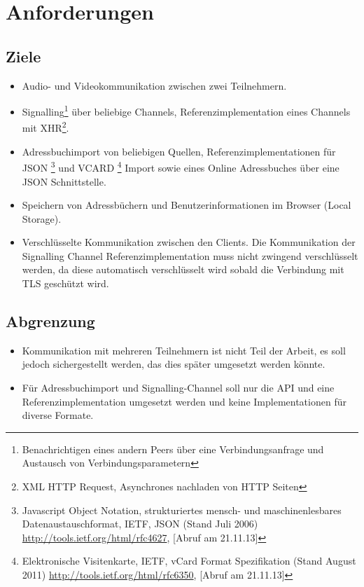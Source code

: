 \chapter{Anforderungen}
	\section{Ziele}
		\begin{itemize}
			\item Audio- und Videokommunikation zwischen zwei Teilnehmern.
			\item Signalling\footnote{Benachrichtigen eines andern Peers über eine Verbindungsanfrage und Austausch von Verbindungsparametern} über beliebige Channels, Referenzimplementation eines Channels mit XHR\footnote{XML HTTP Request, Asynchrones nachladen von HTTP Seiten}.
			\item Adressbuchimport von beliebigen Quellen, Referenzimplementationen für JSON
				\footnote{Javascript Object Notation, strukturiertes mensch- und maschinenlesbares Datenaustauschformat, 
					IETF, JSON (Stand Juli 2006)
					\hyperlink{http://tools.ietf.org/html/rfc4627}{http://tools.ietf.org/html/rfc4627}, [Abruf am 21.11.13]
				} und VCARD
				\footnote{Elektronische Visitenkarte, IETF, vCard Format Spezifikation (Stand August 2011) 
					\hyperlink{http://tools.ietf.org/html/rfc6350}{http://tools.ietf.org/html/rfc6350}, [Abruf am 21.11.13]
				} Import sowie eines Online Adressbuches über eine JSON Schnittstelle.
			\item Speichern von Adressbüchern und Benutzerinformationen im Browser (Local Storage).
			\item Verschlüsselte Kommunikation zwischen den Clients. Die Kommunikation der Signalling Channel Referenzimplementation muss nicht zwingend verschlüsselt werden, da diese automatisch verschlüsselt wird sobald die Verbindung mit TLS geschützt wird.
		\end{itemize}

	
	\section{Abgrenzung}
		\begin{itemize}
			\item Kommunikation mit mehreren Teilnehmern ist nicht Teil der Arbeit, es soll jedoch sichergestellt werden, das dies später umgesetzt werden könnte.
			\item Für Adressbuchimport und Signalling-Channel soll nur die API und eine
			Referenzimplementation umgesetzt werden und keine Implementationen für diverse Formate.
		\end{itemize}
		
